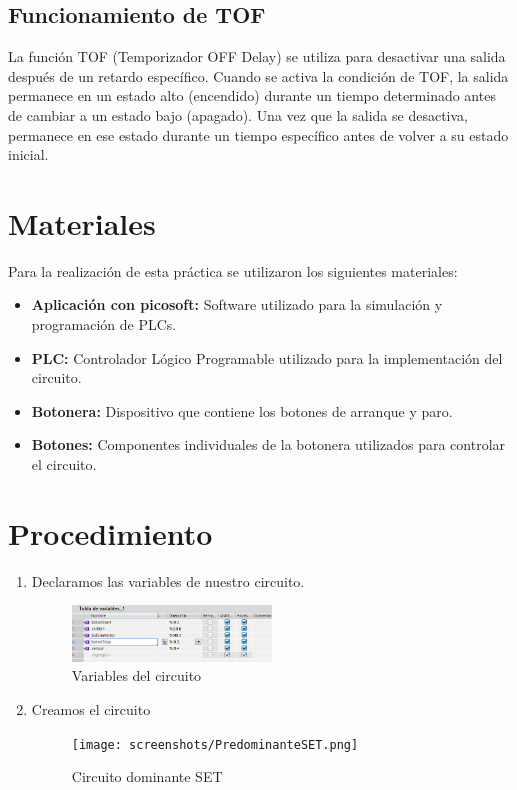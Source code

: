\documentclass[12pt]{report}
\begin{document}
\subsection{Funcionamiento de TOF}
La función TOF (Temporizador OFF Delay) se utiliza para desactivar una salida después de un retardo específico. Cuando se activa la condición de TOF, la salida permanece en un estado alto (encendido) durante un tiempo determinado antes de cambiar a un estado bajo (apagado). Una vez que la salida se desactiva, permanece en ese estado durante un tiempo específico antes de volver a su estado inicial.


\section{Materiales}
Para la realización de esta práctica se utilizaron los siguientes materiales:

\begin{itemize}
  \item \textbf{Aplicación con picosoft:} Software utilizado para la simulación y programación de PLCs.
  \item \textbf{PLC:} Controlador Lógico Programable utilizado para la implementación del circuito.
  \item \textbf{Botonera:} Dispositivo que contiene los botones de arranque y paro.
  \item \textbf{Botones:} Componentes individuales de la botonera utilizados para controlar el circuito.
\end{itemize}

\section{Procedimiento}
\begin{enumerate}
  \item Declaramos las variables de nuestro circuito.
        \begin{figure}[H]
          \centering
          \includegraphics[width=0.5\textwidth]{screenshots/variables.png}
          \caption{Variables del circuito}
          \label{fig:variables}
        \end{figure}
  \item Creamos el circuito
        \begin{figure}[H]
          \centering
          \texttt{[image: screenshots/PredominanteSET.png]}
          \caption{Circuito dominante SET}
          \label{fig:set}
        \end{figure}
\end{enumerate}
\newpage
\end{document}
